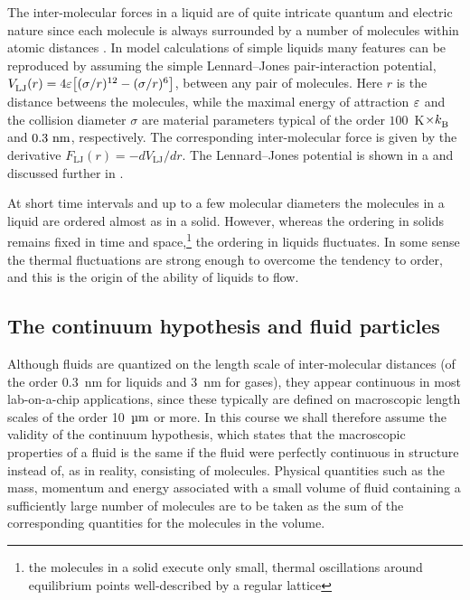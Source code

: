 The inter-molecular forces in a liquid are of quite intricate
quantum and electric nature since each molecule is always
surrounded by a number of molecules within atomic distances
. In model calculations of simple
liquids many features can be reproduced by assuming the simple
Lennard--Jones pair-interaction potential, $V^{{}}_\textrm{LJ}(r)
= 4\varepsilon \big[(\sigma/r)^{12} - (\sigma/r)^6\big]$, between any pair
of molecules. Here $r$ is the
distance betweens the molecules, while the maximal energy of
attraction $\varepsilon$ and the collision diameter $\sigma$ are material
parameters typical of the order $100$~K$\times{k^{{}_{}}_\mathrm{B}}$ and
$0.3~\textrm{nm}$, respectively. The corresponding inter-molecular force
is given by the derivative $F^{{}}_\textrm{LJ}(r) =
-dV^{{}}_\textrm{LJ}/dr$. The Lennard--Jones potential is shown in
a and discussed further in
.

At short time intervals and up to a few molecular diameters the
molecules in a liquid are ordered almost as in a solid. However,
whereas the ordering in solids remains fixed in time and
space,\footnote{the molecules in a solid execute only small,
thermal oscillations around equilibrium points well-described by a
regular lattice} the ordering in liquids fluctuates. In some sense
the thermal fluctuations are strong enough to overcome the
tendency to order, and this is the origin of the ability of
liquids to flow.


\subsection{The continuum hypothesis and fluid particles}

Although fluids are quantized on the length scale of
inter-molecular distances (of the order 0.3~nm for liquids and
3~nm for gases), they appear continuous in most lab-on-a-chip
applications, since these typically are defined on macroscopic
length scales of the order 10~$\SImum$ or more. In this course we
shall therefore assume the validity of the continuum hypothesis,
which states that the macroscopic properties of a fluid is the
same if the fluid were perfectly continuous in structure instead
of, as in reality, consisting of molecules. Physical quantities
such as the mass, momentum and energy associated with a small
volume of fluid containing a sufficiently large number of
molecules are to be taken as the sum of the corresponding
quantities for the molecules in the volume.

